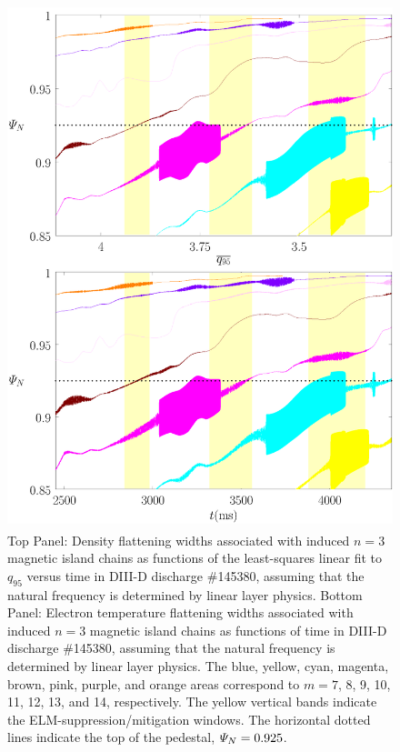 \documentclass[12pt,prb,aps]{revtex4-1}
\begin{document}
\begin{figure}
\includegraphics[height=6in]{fig13.pdf}
\caption{Top Panel: Density flattening widths associated with induced $n=3$ magnetic island  chains as functions of the least-squares linear fit to $q_{95}$ versus time
in   DIII-D discharge \#145380, assuming that the natural frequency is determined by linear layer physics.
Bottom Panel:  Electron temperature flattening widths associated with induced $n=3$ magnetic island chains as functions of time
in   DIII-D discharge \#145380, assuming that the natural frequency is determined by linear layer physics. The blue, yellow, cyan, magenta, brown, pink,
purple, and orange  areas correspond to $m=7$, 8, 9, 10, 11, 12, 13, and 14, respectively. The yellow vertical bands indicate the ELM-suppression/mitigation windows. 
The horizontal dotted lines indicate  the top of the pedestal, ${\mit\Psi}_N=0.925$.} \label{fig13}
\end{figure}
\end{document}
